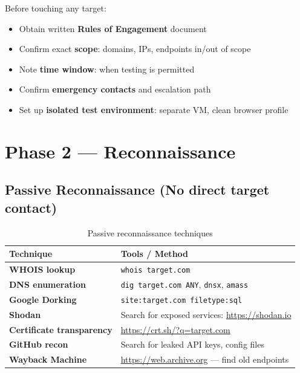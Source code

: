 Before touching any target:

\begin{itemize}
  \item Obtain written \textbf{Rules of Engagement} document
  \item Confirm exact \textbf{scope}: domains, IPs, endpoints in/out of scope
  \item Note \textbf{time window}: when testing is permitted
  \item Confirm \textbf{emergency contacts} and escalation path
  \item Set up \textbf{isolated test environment}: separate VM, clean browser profile
\end{itemize}


\section{Phase 2 — Reconnaissance}

\subsection{Passive Reconnaissance (No direct target contact)}

\begin{table}[H]
\centering
\caption{Passive reconnaissance techniques}
\begin{tabularx}{\textwidth}{>{\bfseries}lX}
\toprule
Technique & Tools / Method \\
\midrule
WHOIS lookup & \texttt{whois target.com} \\
DNS enumeration & \texttt{dig target.com ANY}, \texttt{dnsx}, \texttt{amass} \\
Google Dorking & \texttt{site:target.com filetype:sql} \\
Shodan & Search for exposed services: \url{https://shodan.io} \\
Certificate transparency & \url{https://crt.sh/?q=target.com} \\
GitHub recon & Search for leaked API keys, config files \\
Wayback Machine & \url{https://web.archive.org} — find old endpoints \\
\bottomrule
\end{tabularx}
\end{table}

